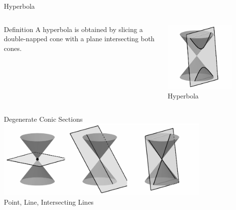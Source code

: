 \documentclass[14pt,aspectratio=169]{beamer}
\begin{document}
\begin{frame}{Hyperbola}
 \begin{columns}
    \begin{block}{Definition}
     \vspace{1mm}
      A hyperbola is obtained by slicing a double-napped cone with a plane intersecting both cones.
      \vspace{1mm}
     \end{block}
     \centering
        \includegraphics[width=0.8\textwidth]{image10.png}\\Hyperbola

    \end{columns}

\end{frame}

\begin{frame}{Degenerate Conic Sections}
 \centering
        \includegraphics[width=0.8\textwidth]{image11.png}\\Point, Line, Intersecting Lines
\end{frame}
\end{document}

